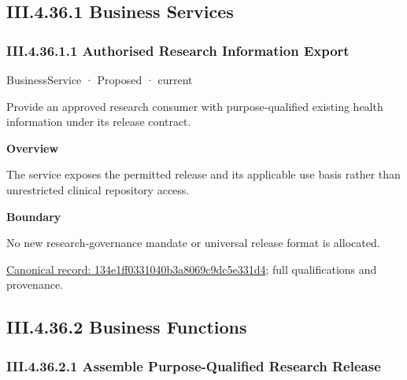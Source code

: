 \subsection*{III.4.36.1 Business Services}
\label{navigation:III.4.36.1}

\subsubsection*{III.4.36.1.1 Authorised Research Information Export}
\label{navigation:III.4.36.1.1}

\label{element:134e1ff0331040b3a8069c9dc5e331d4}
{\small BusinessService · Proposed · current}\par

Provide an approved research consumer with purpose-qualified existing health information under its release contract.



\textbf{Overview}



The service exposes the permitted release and its applicable use basis rather than unrestricted clinical repository access.



\textbf{Boundary}



No new research-governance mandate or universal release format is allocated.


{\footnotesize \href{../../../../continuum/business/business-service/134e1ff0331040b3a8069c9dc5e331d4.md}{Canonical record: 134e1ff0331040b3a8069c9dc5e331d4}; full qualifications and provenance.}\par
\subsection*{III.4.36.2 Business Functions}
\label{navigation:III.4.36.2}

\subsubsection*{III.4.36.2.1 Assemble Purpose-Qualified Research Release}
\label{navigation:III.4.36.2.1}

